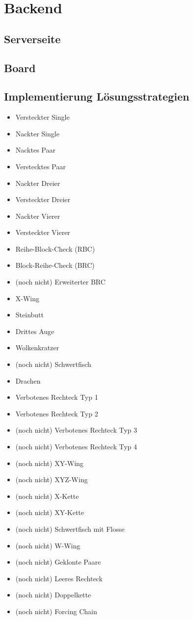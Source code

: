 
\chapter{Backend}

\section{Serverseite}

\section{Board}

\section{Implementierung Lösungsstrategien}
\begin{itemize}
	\item Versteckter Single
	\item Nackter Single
	\item Nacktes Paar
	\item Verstecktes Paar
	\item Nackter Dreier
	\item Versteckter Dreier
	\item Nackter Vierer
	\item Versteckter Vierer
	\item Reihe-Block-Check (RBC)
	\item Block-Reihe-Check (BRC)
	\item (noch nicht) Erweiterter BRC
	\item X-Wing
	\item Steinbutt
	\item Drittes Auge
	\item Wolkenkratzer
	\item (noch nicht) Schwertfisch
	\item Drachen
	\item Verbotenes Rechteck Typ 1
	\item Verbotenes Rechteck Typ 2
	\item (noch nicht) Verbotenes Rechteck Typ 3
	\item (noch nicht) Verbotenes Rechteck Typ 4
	\item (noch nicht) XY-Wing
	\item (noch nicht) XYZ-Wing
	\item (noch nicht) X-Kette
	\item (noch nicht) XY-Kette
	\item (noch nicht) Schwertfisch mit Flosse
	\item (noch nicht) W-Wing
	\item (noch nicht) Geklonte Paare
	\item (noch nicht) Leeres Rechteck
	\item (noch nicht) Doppelkette
	\item (noch nicht) Forcing Chain
	
\end{itemize}